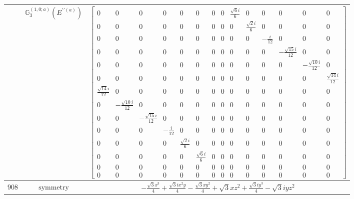 \documentclass[fleqn,8pt,landscape]{jsarticle}
\begin{document}
\begin{longtable}{ccc}
$  $ & $ \mathbb{G}_{3}^{(1,0;a)}(E^{\prime\prime(a)}) $ & $ \begin{bmatrix} 0 & 0 & 0 & 0 & 0 & 0 & 0 & 0 & \frac{\sqrt{6} i}{6} & 0 & 0 & 0 & 0 & 0 \\ 0 & 0 & 0 & 0 & 0 & 0 & 0 & 0 & 0 & \frac{\sqrt{2} i}{6} & 0 & 0 & 0 & 0 \\ 0 & 0 & 0 & 0 & 0 & 0 & 0 & 0 & 0 & 0 & - \frac{i}{12} & 0 & 0 & 0 \\ 0 & 0 & 0 & 0 & 0 & 0 & 0 & 0 & 0 & 0 & 0 & - \frac{\sqrt{15} i}{12} & 0 & 0 \\ 0 & 0 & 0 & 0 & 0 & 0 & 0 & 0 & 0 & 0 & 0 & 0 & - \frac{\sqrt{10} i}{12} & 0 \\ 0 & 0 & 0 & 0 & 0 & 0 & 0 & 0 & 0 & 0 & 0 & 0 & 0 & \frac{\sqrt{14} i}{12} \\ \frac{\sqrt{14} i}{12} & 0 & 0 & 0 & 0 & 0 & 0 & 0 & 0 & 0 & 0 & 0 & 0 & 0 \\ 0 & - \frac{\sqrt{10} i}{12} & 0 & 0 & 0 & 0 & 0 & 0 & 0 & 0 & 0 & 0 & 0 & 0 \\ 0 & 0 & - \frac{\sqrt{15} i}{12} & 0 & 0 & 0 & 0 & 0 & 0 & 0 & 0 & 0 & 0 & 0 \\ 0 & 0 & 0 & - \frac{i}{12} & 0 & 0 & 0 & 0 & 0 & 0 & 0 & 0 & 0 & 0 \\ 0 & 0 & 0 & 0 & \frac{\sqrt{2} i}{6} & 0 & 0 & 0 & 0 & 0 & 0 & 0 & 0 & 0 \\ 0 & 0 & 0 & 0 & 0 & \frac{\sqrt{6} i}{6} & 0 & 0 & 0 & 0 & 0 & 0 & 0 & 0 \\ 0 & 0 & 0 & 0 & 0 & 0 & 0 & 0 & 0 & 0 & 0 & 0 & 0 & 0 \\ 0 & 0 & 0 & 0 & 0 & 0 & 0 & 0 & 0 & 0 & 0 & 0 & 0 & 0 \end{bmatrix} $ \\ \hline
$ 908 $ & $ \text{symmetry} $ & $ - \frac{\sqrt{3} x^{3}}{4} + \frac{\sqrt{3} i x^{2} y}{4} - \frac{\sqrt{3} x y^{2}}{4} + \sqrt{3} x z^{2} + \frac{\sqrt{3} i y^{3}}{4} - \sqrt{3} i y z^{2} $ \\

\end{longtable}
\end{document}
